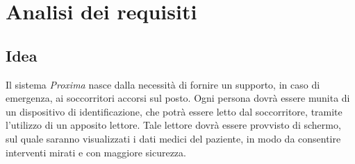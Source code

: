 \documentclass[a4paper,12pt]{report}
\begin{document}
\chapter{Analisi dei requisiti} \label{requirements}
\section{Idea}
Il sistema \emph{Proxima} nasce dalla necessità di fornire un supporto, in caso di emergenza, ai soccorritori accorsi sul posto. Ogni persona dovrà essere munita di un dispositivo di identificazione, che potrà essere letto dal soccorritore, tramite l'utilizzo di un apposito lettore. Tale lettore dovrà essere provvisto di schermo, sul quale saranno visualizzati i dati medici del paziente, in modo da consentire interventi mirati e con maggiore sicurezza. 
\end{document}
